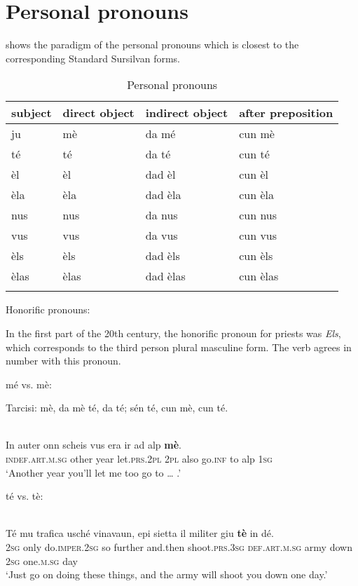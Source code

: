 {\section{Personal pronouns}
 shows the paradigm of the personal pronouns which is closest to the corresponding Standard Sursilvan forms.

\begin{table}
\caption{Personal pronouns}
\label{tab:perspron}
 \begin{tabular}{llll}
  \lsptoprule
  subject & direct object & indirect object & after preposition\\
  \midrule
ju & mè & da mé & cun mè \\
té & té & da té & cun té\\
èl & èl	& dad èl & cun èl \\
èla & èla & dad èla & cun èla\\
nus & nus & da nus & cun nus\\
vus & vus & da vus & cun vus\\
èls & èls & dad èls & cun èls\\
èlas & èlas & dad èlas & cun èlas\\
 \lspbottomrule
 \end{tabular}
\end{table}


Honorific pronouns:

In the first part of the 20th century, the honorific pronoun for priests was \textit{Els}, which corresponds to the third person plural masculine form. The verb agrees in number with this pronoun.



mé vs. mè:

Tarcisi: mè, da mè té, da té; sén té, cun mè, cun té.


\ea\label{}
\\
\gll In auter onn scheis vus era ir ad alp \textbf{mè}.\\
 \textsc{indef.art.m.sg} other year let.\textsc{prs.2pl} \textsc{2pl} also go.\textsc{inf} to alp \textsc{1sg}\\
\glt `Another year you’ll let me too go to … .'
\z

té vs. tè:

\ea\label{}
\\
\gll    Té mu trafica usché vinavaun, epi sietta il militer giu \textbf{tè} in dé.\\
  \textsc{2sg} only do.\textsc{imper.2sg} so further and.then shoot.\textsc{prs.3sg} \textsc{def.art.m.sg} army down \textsc{2sg} one.\textsc{m.sg} day\\
\glt `Just go on doing these things, and the army will shoot you  down one day.'
\z

}
